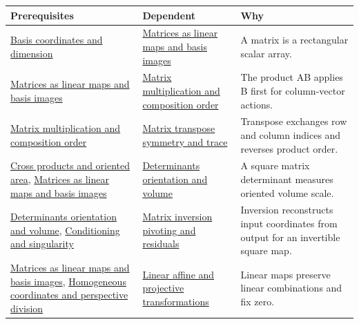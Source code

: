 {\def\LTcaptype{none} %
\begin{longtable}[]{@{}
  >{\raggedright\arraybackslash}p{}
  >{\raggedright\arraybackslash}p{}
  >{\raggedright\arraybackslash}p{}@{}}
\toprule\noalign{}
\begin{minipage}[b]{\linewidth}\raggedright
Prerequisites
\end{minipage} & \begin{minipage}[b]{\linewidth}\raggedright
Dependent
\end{minipage} & \begin{minipage}[b]{\linewidth}\raggedright
Why
\end{minipage} \\
\midrule\noalign{}
\endhead
\bottomrule\noalign{}
\endlastfoot
\hyperref[appendix-ce0341f7ea0d]{Basis coordinates and dimension} & \hyperref[appendix-bd39c3bf5d64]{Matrices as linear maps and basis images} & A matrix is a rectangular scalar array. \\
\hyperref[appendix-bd39c3bf5d64]{Matrices as linear maps and basis images} & \hyperref[appendix-ab31ef447dbf]{Matrix multiplication and composition order} & The product AB applies B first for column-vector actions. \\
\hyperref[appendix-ab31ef447dbf]{Matrix multiplication and composition order} & \hyperref[appendix-175ca5ff874d]{Matrix transpose symmetry and trace} & Transpose exchanges row and column indices and reverses product order. \\
\hyperref[appendix-2391db8052b1]{Cross products and oriented area}, \hyperref[appendix-bd39c3bf5d64]{Matrices as linear maps and basis images} & \hyperref[appendix-da478be01d02]{Determinants orientation and volume} & A square matrix determinant measures oriented volume scale. \\
\hyperref[appendix-da478be01d02]{Determinants orientation and volume}, \hyperref[appendix-8f6a01f284a7]{Conditioning and singularity} & \hyperref[appendix-48d2e66378ab]{Matrix inversion pivoting and residuals} & Inversion reconstructs input coordinates from output for an invertible square map. \\
\hyperref[appendix-bd39c3bf5d64]{Matrices as linear maps and basis images}, \hyperref[appendix-cb3b26862282]{Homogeneous coordinates and perspective division} & \hyperref[appendix-0bf0ca73f735]{Linear affine and projective transformations} & Linear maps preserve linear combinations and fix zero. \\

\end{longtable}}

